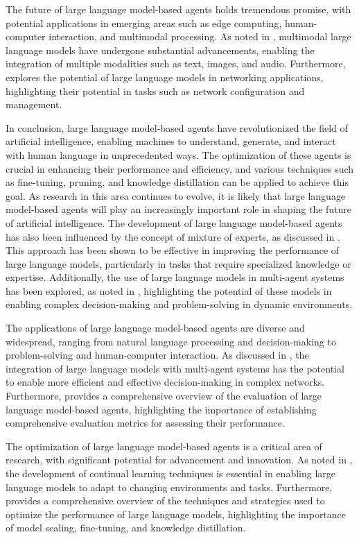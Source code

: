\documentclass[11pt,a4paper]{article}
\begin{document}
The future of large language model-based agents holds tremendous promise, with potential applications in emerging areas such as edge computing, human-computer interaction, and multimodal processing. As noted in \cite{arxiv:2401.13601}, multimodal large language models have undergone substantial advancements, enabling the integration of multiple modalities such as text, images, and audio. Furthermore, \cite{doi:10.1109/mnet.2024.3435752} explores the potential of large language models in networking applications, highlighting their potential in tasks such as network configuration and management.

In conclusion, large language model-based agents have revolutionized the field of artificial intelligence, enabling machines to understand, generate, and interact with human language in unprecedented ways. The optimization of these agents is crucial in enhancing their performance and efficiency, and various techniques such as fine-tuning, pruning, and knowledge distillation can be applied to achieve this goal. As research in this area continues to evolve, it is likely that large language model-based agents will play an increasingly important role in shaping the future of artificial intelligence.
The development of large language model-based agents has also been influenced by the concept of mixture of experts, as discussed in \cite{doi:10.1109/tkde.2025.3554028}. This approach has been shown to be effective in improving the performance of large language models, particularly in tasks that require specialized knowledge or expertise. Additionally, the use of large language models in multi-agent systems has been explored, as noted in \cite{doi:10.1109/mwc.016.2300600}, highlighting the potential of these models in enabling complex decision-making and problem-solving in dynamic environments.

The applications of large language model-based agents are diverse and widespread, ranging from natural language processing and decision-making to problem-solving and human-computer interaction. As discussed in \cite{arxiv:2309.14365}, the integration of large language models with multi-agent systems has the potential to enable more efficient and effective decision-making in complex networks. Furthermore, \cite{arxiv:2308.03688} provides a comprehensive overview of the evaluation of large language model-based agents, highlighting the importance of establishing comprehensive evaluation metrics for assessing their performance.

The optimization of large language model-based agents is a critical area of research, with significant potential for advancement and innovation. As noted in \cite{arxiv:2402.01364}, the development of continual learning techniques is essential in enabling large language models to adapt to changing environments and tasks. Furthermore, \cite{doi:10.1109/access.2024.3424945} provides a comprehensive overview of the techniques and strategies used to optimize the performance of large language models, highlighting the importance of model scaling, fine-tuning, and knowledge distillation.
\end{document}
